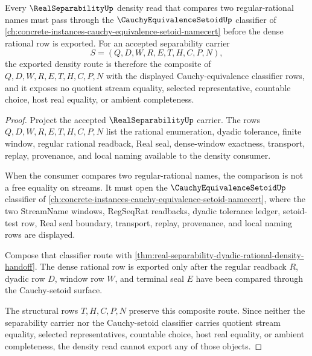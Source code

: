 \begin{theorem}
\label{thm:real-separability-cauchy-setoid-density-stability}
Every $\RealSeparabilityUp$ density read that compares two regular-rational names must pass through the $\CauchyEquivalenceSetoidUp$ classifier of \autoref{ch:concrete-instances-cauchy-equivalence-setoid-namecert} before the dense rational row is exported. For an accepted separability carrier
$$
S=(Q,D,W,R,E,T,H,C,P,N),
$$
the exported density route is therefore the composite of $Q,D,W,R,E,T,H,C,P,N$ with the displayed Cauchy-equivalence classifier rows, and it exposes no quotient stream equality, selected representative, countable choice, host real equality, or ambient completeness.
\end{theorem}
\begin{proof}
Project the accepted $\RealSeparabilityUp$ carrier. The rows $Q,D,W,R,E,T,H,C,P,N$ list the rational enumeration, dyadic tolerance, finite window, regular rational readback, Real seal, dense-window exactness, transport, replay, provenance, and local naming available to the density consumer.

When the consumer compares two regular-rational names, the comparison is not a free equality on streams. It must open the $\CauchyEquivalenceSetoidUp$ classifier of \autoref{ch:concrete-instances-cauchy-equivalence-setoid-namecert}, where the two StreamName windows, RegSeqRat readbacks, dyadic tolerance ledger, setoid-test row, Real seal boundary, transport, replay, provenance, and local naming rows are displayed.

Compose that classifier route with \autoref{thm:real-separability-dyadic-rational-density-handoff}. The dense rational row is exported only after the regular readback $R$, dyadic row $D$, window row $W$, and terminal seal $E$ have been compared through the Cauchy-setoid surface.

The structural rows $T,H,C,P,N$ preserve this composite route. Since neither the separability carrier nor the Cauchy-setoid classifier carries quotient stream equality, selected representatives, countable choice, host real equality, or ambient completeness, the density read cannot export any of those objects.
\end{proof}

